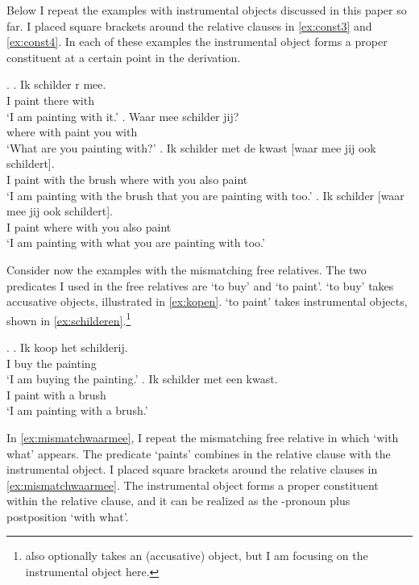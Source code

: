 \documentclass[11pt,a4paper]{article}
\begin{document}
Below I repeat the examples with instrumental objects discussed in this paper so far. I placed square brackets around the relative clauses in \ref{ex:const3} and \ref{ex:const4}. In each of these examples the instrumental object forms a proper constituent at a certain point in the derivation.

\ex.
\ag. Ik schilder r mee.\\
 I paint there with\\
 `I am painting with it.'\label{ex:const1}
\bg. Waar mee schilder jij?\\
where with paint you with\\
 `What are you painting with?'\label{ex:const2}
\bg. Ik schilder met de kwast [waar mee jij ook schildert].\\
 I paint with the brush where with you also paint\\
 `I am painting with the brush that you are painting with too.'\label{ex:const3}
\bg. Ik schilder [waar mee jij ook schildert].\\
 I paint where with you also paint\\
 `I am painting with what you are painting with too.'\label{ex:const4}

Consider now the examples with the mismatching free relatives. The two predicates I used in the free relatives are  `to buy' and  `to paint'.  `to buy' takes accusative objects, illustrated in \ref{ex:kopen}.  `to paint' takes instrumental objects, shown in \ref{ex:schilderen}.\footnote{ also optionally takes an (accusative) object, but I am focusing on the instrumental object here.}

\ex.
\ag. Ik koop het schilderij.\\
 I buy the painting\\
 `I am buying the painting.'\label{ex:kopen}
\bg. Ik schilder met een kwast.\\
 I paint with a brush\\
 `I am painting with a brush.'\label{ex:schilderen}

In \ref{ex:mismatchwaarmee}, I repeat the mismatching free relative in which  `with what' appears. The predicate  `paints' combines in the relative clause with the instrumental object. I placed square brackets around the relative clauses in \ref{ex:mismatchwaarmee}. The instrumental object forms a proper constituent within the relative clause, and it can be realized as the -pronoun plus postposition  `with what'.
\end{document}
